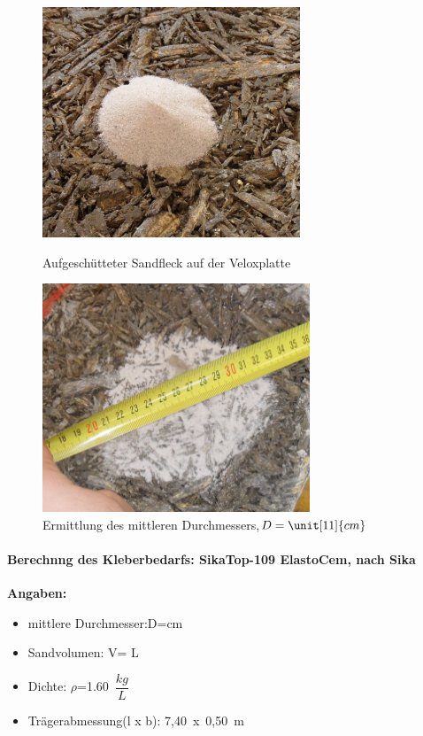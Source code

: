 \begin{figure}[h]
\begin{minipage}[hbt]{7cm}	
	\includegraphics[width=7.7cm]{Verbindungsmittel/kleber/sandfleck.png}
	\caption{Aufgeschütteter Sandfleck auf der Veloxplatte}
	\label{sandfleck}
\end{minipage}
\hfill
\begin{minipage}[hbt]{7cm}
	\includegraphics[width=8cm]{Verbindungsmittel/kleber/sandfleckmessen.png}
	\caption{Ermittlung des mittleren Durchmessers,$D=\unit[11]{cm}$}
	\label{sandfleckmessen}
\end{minipage}
\end{figure}
\paragraph{Berechnng des Kleberbedarfs: SikaTop-109 ElastoCem, nach Sika}

\textbf{Angaben:}
\begin{center}

\begin{itemize}
\item mittlere Durchmesser:D=\unit[11]{cm}
\item Sandvolumen:	V= \unit[0,01]{L}
\item Dichte:	$\rho$=1.60\, $\dfrac{kg}{L}$
\item Trägerabmessung(l x b):	7,40\, x\, 0,50\, m 
\end{itemize}
\end{center}


